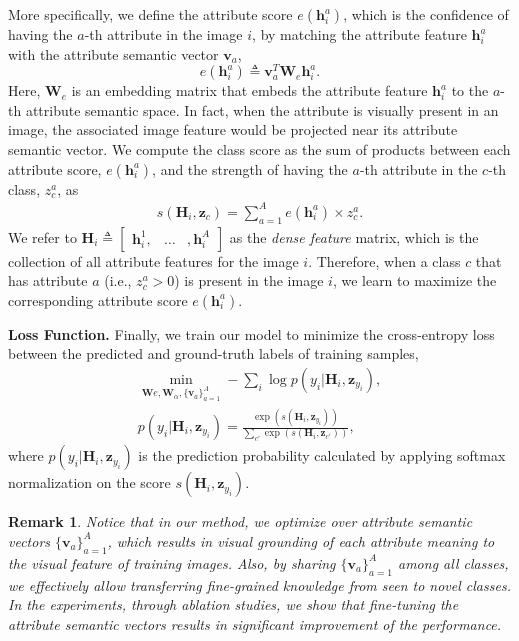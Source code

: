 \documentclass[10pt,journal,compsoc]{IEEEtran}
\newcommand{\z}{\boldsymbol{z}}
\newcommand{\h}{\boldsymbol{h}}
\newcommand{\W}{\boldsymbol{W}}
\renewcommand{\v}{\boldsymbol{v}}
\renewcommand{\H}{\boldsymbol{H}}
\newcommand{\1}{\boldsymbol{1}}
\newcommand{\0}{\boldsymbol{0}}
\newcommand{\<}{\langle}
\renewcommand{\>}{\rangle}
\newtheorem{remark}{Remark}
\newcommand{\myparagraph}[1]{\vspace{-2pt}\medskip\noindent\textbf{#1}}
\begin{document}
More specifically, we define the attribute score $e(\h^a_i)$, which is the confidence of having the $a$-th attribute in the image $i$, by matching the attribute feature $\h^a_i$ with the attribute semantic vector $\v_a$,
\begin{equation}
\label{eq:attr-score}
e(\h^a_i) \triangleq \v_a^T \W_{e} \h_i^a.
\end{equation}
Here, $\W_{e}$ is an embedding matrix that embeds the attribute feature $\h^a_i$ to the $a$-th attribute semantic space. In fact, when the attribute is visually present in an image, the associated image feature would be projected near its attribute semantic vector. We compute the class score as the sum of products between each attribute score, $e(\h_i^a)$, and the strength of having the $a$-th attribute in the $c$-th class, $z^a_c$, as
\begin{equation}
\begin{gathered}
\label{eq:class-score-0}
s(\H_i,\z_c) = \sum_{a=1}^{A} e(\h_i^a) \times z^a_c.
\end{gathered}
\end{equation}
We refer to $\H_i \triangleq \begin{bmatrix} \h^1_{i}, \!\!&\!\!\ldots \!\!&\!\!, \h^A_{i} \end{bmatrix}$ as the \emph{dense feature} matrix, which is the collection of all attribute features for the image $i$. Therefore, when a class $c$ that has attribute $a$ (i.e., $z^a_c > 0$) is present in the image $i$, we learn to maximize the corresponding attribute score $e(\h^a_i)$.

\myparagraph{Loss Function.}
Finally, we train our model to minimize the cross-entropy loss between the predicted and ground-truth labels of training samples,
\begin{equation}
\begin{gathered}
\label{eq:loss_att}
\min_{\W{e},\W_{\alpha},\{\v_a\}^A_{a=1}} - \sum_{i}\log p(y_i|\H_i,\z_{y_i}),\\
p(y_i|\H_i,\z_{y_i}) = \frac{\exp(s(\H_i,\z_{y_i}))}{\sum_{c'}\exp(s(\H_i,\z_{c'}))},
\end{gathered}
\end{equation}
where $p(y_i|\H_i,\z_{y_i})$ is the prediction probability calculated by applying softmax normalization on the score $s(\H_i,\z_{y_i})$. 
\begin{remark}
Notice that in our method, we optimize over attribute semantic vectors $\{\v_a\}_{a=1}^{A}$, which results in visual grounding of each attribute meaning to the visual feature of training images. Also, by sharing $\{\v_a\}_{a=1}^{A}$ among all classes, we effectively allow transferring fine-grained knowledge from seen to novel classes. In the experiments, through ablation studies, we show that fine-tuning the attribute semantic vectors results in significant improvement of the performance.
\end{remark}
\end{document}

